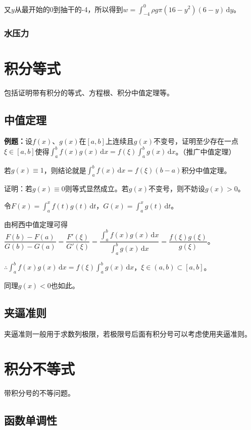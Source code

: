 \documentclass[UTF8, 12pt]{ctexart}
\begin{document}
又$y$从最开始的0到抽干的-4，所以得到$w=\int_{-4}^0\rho g\pi(16-y^2)(6-y)\,\textrm{d}y$。

\subsubsection{水压力}

\section{积分等式}

包括证明带有积分的等式、方程根、积分中值定理等。

\subsection{中值定理}

\textbf{例题：}设$f(x)$、$g(x)$在$[a,b]$上连续且$g(x)$不变号，证明至少存在一点$\xi\in[a,b]$使得$\int_a^bf(x)g(x)\,\textrm{d}x=f(\xi)\int_a^bg(x)\,\textrm{d}x$。（推广中值定理）

若$g(x)\equiv1$，则结论就是$\int_a^bf(x)\,\textrm{d}x=f(\xi)(b-a)$积分中值定理。

证明：若$g(x)\equiv0$则等式显然成立。若$g(x)$不变号，则不妨设$g(x)>0$。

令$F(x)=\int_a^xf(t)g(t)\,\textrm{d}t$，$G(x)=\int_a^xg(t)\,\textrm{d}t$。

由柯西中值定理可得$\dfrac{F(b)-F(a)}{G(b)-G(a)}=\dfrac{F'(\xi)}{G'(\xi)}=\dfrac{\int_a^bf(x)g(x)\,\textrm{d}x}{\int_a^bg(x)\,\textrm{d}x}=\dfrac{f(\xi)g(\xi)}{g(\xi)}$。

$\therefore\int_a^bf(x)g(x)\,\textrm{d}x=f(\xi)\int_a^bg(x)\,\textrm{d}x$，$\xi\in(a,b)\subset[a,b]$。

同理$g(x)<0$也如此。

\subsection{夹逼准则}

夹逼准则一般用于求数列极限，若极限号后面有积分号可以考虑使用夹逼准则。

\section{积分不等式}

带积分号的不等问题。

\subsection{函数单调性}
\end{document}
